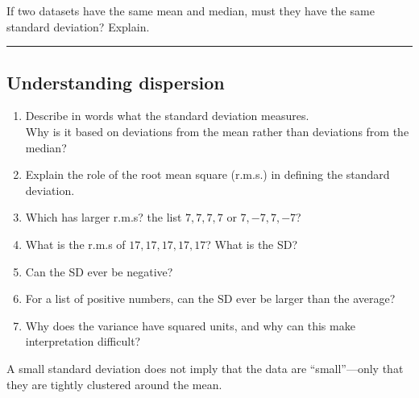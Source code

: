 \documentclass[
  letterpaper,
  DIV=11,
  numbers=noendperiod]{scrreprt}
\begin{document}
\begin{tcolorbox}[enhanced jigsaw, coltitle=black, colbacktitle=quarto-callout-note-color!10!white, left=2mm, bottomrule=.15mm, bottomtitle=1mm, colback=white, titlerule=0mm, colframe=quarto-callout-note-color-frame, breakable, leftrule=.75mm, toptitle=1mm, opacitybacktitle=0.6, rightrule=.15mm, title=\textcolor{quarto-callout-note-color}{\faInfo}\hspace{0.5em}{Check your understanding}, arc=.35mm, opacityback=0, toprule=.15mm]

If two datasets have the same mean and median, must they have the same
standard deviation? Explain.

\end{tcolorbox}

\begin{center}\rule{0.5\linewidth}{0.5pt}\end{center}

\subsection{Understanding dispersion}\label{understanding-dispersion}

\begin{enumerate}
\def\labelenumi{\arabic{enumi}.}
\setcounter{enumi}{4}
\item
  Describe in words what the standard deviation measures.\\
  Why is it based on deviations from the mean rather than deviations
  from the median?
\item
  Explain the role of the root mean square (r.m.s.) in defining the
  standard deviation.
\item
  Which has larger r.m.s? the list \(7,7,7,7\) or \(7,-7,7,-7\)?
\item
  What is the r.m.s of \(17,17,17,17,17\)? What is the SD?
\item
  Can the SD ever be negative?
\item
  For a list of positive numbers, can the SD ever be larger than the
  average?
\item
  Why does the variance have squared units, and why can this make
  interpretation difficult?
\end{enumerate}

\begin{tcolorbox}[enhanced jigsaw, coltitle=black, colbacktitle=quarto-callout-warning-color!10!white, left=2mm, bottomrule=.15mm, bottomtitle=1mm, colback=white, titlerule=0mm, colframe=quarto-callout-warning-color-frame, breakable, leftrule=.75mm, toptitle=1mm, opacitybacktitle=0.6, rightrule=.15mm, title=\textcolor{quarto-callout-warning-color}{\faExclamationTriangle}\hspace{0.5em}{Common pitfall}, arc=.35mm, opacityback=0, toprule=.15mm]

A small standard deviation does not imply that the data are
``small''---only that they are tightly clustered around the mean.

\end{tcolorbox}
\end{document}

